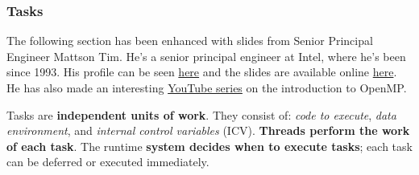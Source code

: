 \newpage

\subsubsection{Tasks}

The following section has been enhanced with slides from Senior Principal Engineer Mattson Tim. He's a senior principal engineer at Intel, where he's been since 1993. His profile can be seen \href{https://www.intel.com/content/www/us/en/research/featured-researchers/tim-mattson.html}{here} and the slides are available online \href{https://www.openmp.org/wp-content/uploads/Intro_To_OpenMP_Mattson.pdf}{here}. He has also made an interesting \href{https://youtube.com/playlist?list=PLLX-Q6B8xqZ8n8bwjGdzBJ25X2utwnoEG&si=OBjyY4AI4zWfA-vB}{YouTube series} on the introduction to OpenMP.

\highspace
Tasks are \textbf{independent units of work}. They consist of: \emph{code to execute}, \emph{data environment}, and \emph{internal control variables} (ICV). \textbf{Threads perform the work of each task}. The runtime \textbf{system decides when to execute tasks}; each task can be deferred or executed immediately.

